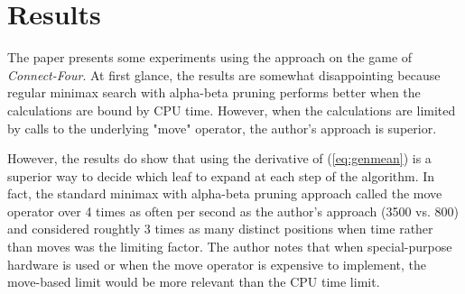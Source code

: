 \documentclass[11pt]{article}
\begin{document}
\vspace{-0.5cm}
\section{Results}
\vspace{-0.5cm}
The paper presents some experiments using the approach on the game of \textit{Connect-Four}. At first glance, the results are somewhat disappointing because regular minimax search with alpha-beta pruning performs better when the calculations are bound by CPU time. However, when the calculations are limited by calls to the underlying "move" operator, the author's approach is superior.

However, the results do show that using the derivative of (\ref{eq:genmean}) is a superior way to decide which leaf to expand at each step of the algorithm. In fact, the standard minimax with alpha-beta pruning approach called the move operator over 4 times as often per second as the author's approach (3500 vs. 800) and considered roughtly 3 times as many distinct positions when time rather than moves was the limiting factor. The author notes that when special-purpose hardware is used or when the move operator is expensive to implement, the move-based limit would be more relevant than the CPU time limit.
\end{document}
